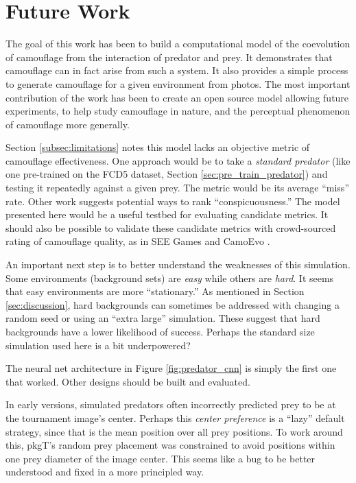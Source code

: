 \documentclass[acmtog,
    anonymous,
    review
    ]{acmart}
\newcommand{\jargon}[1]{\textit{#1}}
\newcommand{\texsyn}[0]{pkgT}
\begin{document}
\section{Future Work}
The goal of this work has been to build a computational model of the coevolution of camouflage from the interaction of predator and prey. It demonstrates that camouflage can in fact arise from such a system. It also provides a simple process to generate camouflage for a given environment from photos. The most important contribution of the work has been to create an open source model allowing future experiments, to help study camouflage in nature, and the perceptual phenomenon of camouflage more generally.
\par
Section \ref{subsec:limitations} notes this model lacks an objective metric of camouflage effectiveness. One approach would be to take a \jargon{standard predator} (like one pre-trained on the FCD5 dataset, Section \ref{sec:pre_train_predator}) and testing it repeatedly against a given prey. The metric would be its average “miss” rate. Other work \cite{lv_cod_2022} suggests potential ways to rank “conspicuousness.” The model presented here would be a useful testbed for evaluating candidate metrics. It should also be possible to validate these candidate metrics with crowd-sourced rating of camouflage quality, as in SEE Games \cite{stevens_games_2022} and CamoEvo \cite{hancock_camoevo_2022}.
\par
An important next step is to better understand the weaknesses of this simulation. Some environments (background sets) are \textit{easy} while others are \textit{hard}. It seems that easy environments are more “stationary.” As mentioned in Section \ref{sec:discussion}, hard backgrounds can sometimes be addressed with changing a random seed or using an “extra large” simulation. These suggest that hard backgrounds have a lower likelihood of success. Perhaps the standard size simulation used here is a bit underpowered?
\par
The neural net architecture in Figure \ref{fig:predator_cnn} is simply the first one that worked. Other designs should be built and evaluated.
\par
In early versions, simulated predators often incorrectly predicted prey to be at the tournament image's center. Perhaps this \jargon{center preference} is a “lazy” default strategy, since that is the mean position over all prey positions. To work around this, \texsyn{}'s random prey placement was constrained to avoid positions within one prey diameter of the image center. This seems like a bug to be better understood and fixed in a more principled way.
\end{document}
